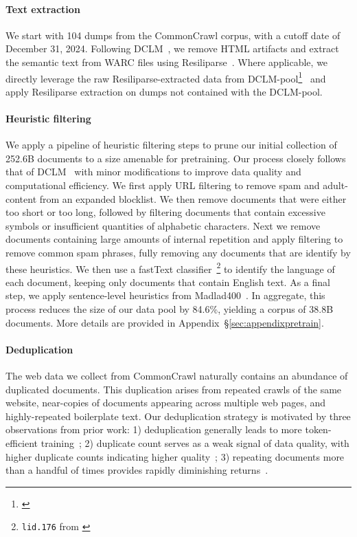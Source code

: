 \documentclass[table]{ai2style/ai2}
\begin{document}
\paragraph{Text extraction} We start with 104 dumps from the CommonCrawl corpus, with a cutoff date of December 31, 2024. Following DCLM~\citep{dclm}, we remove HTML artifacts and extract the semantic text from WARC files using Resiliparse~\citep{bevendorff2018}. Where applicable, we directly leverage the raw Resiliparse-extracted data from DCLM-pool\footnote{\href{https://data.commoncrawl.org/contrib/datacomp/DCLM-pool/index.html}{}}~\citep{dclm} and apply Resiliparse extraction on dumps not contained with the DCLM-pool.

\paragraph{Heuristic filtering} We apply a pipeline of heuristic filtering steps to prune our initial collection of 252.6B documents to a size amenable for pretraining. Our process closely follows that of DCLM~\citep{dclm} with minor modifications to improve data quality and computational efficiency. We first apply URL filtering to remove spam and adult-content from an expanded blocklist. We then remove documents that were either too short or too long, followed by filtering documents that contain excessive symbols or insufficient quantities of alphabetic characters. Next we remove documents containing large amounts of internal repetition and apply filtering to remove common spam phrases, fully removing any documents that are identify by these heuristics. We then use a fastText classifier~\footnote{\texttt{lid.176} from \href{https://fasttext.cc/docs/en/language-identification.html}{}} to identify the language of each document, keeping only documents that contain English text. As a final step, we apply sentence-level heuristics from Madlad400~\citep{dclm}. In aggregate, this process reduces the size of our data pool by 84.6\%, yielding a corpus of 38.8B documents. More details are provided in Appendix~\S\ref{sec:appendixpretrain}.

\paragraph{Deduplication}
The web data we collect from CommonCrawl naturally contains an abundance of duplicated documents. This duplication arises from repeated crawls of the same website, near-copies of documents appearing across multiple web pages, and highly-repeated boilerplate text. Our deduplication strategy is motivated by three observations from prior work: 1) deduplication generally leads to more token-efficient training~\citep{lee2022deduplicatingtrainingdatamakes}; 2) duplicate count serves as a weak signal of data quality, with higher duplicate counts indicating higher quality~\citep{fang2025datasetsdocumentsrepetitionspracticalities}; 3) repeating documents more than a handful of times provides rapidly diminishing returns~\citep{muennighoff2025scalingdataconstrainedlanguagemodels}.
\end{document}
